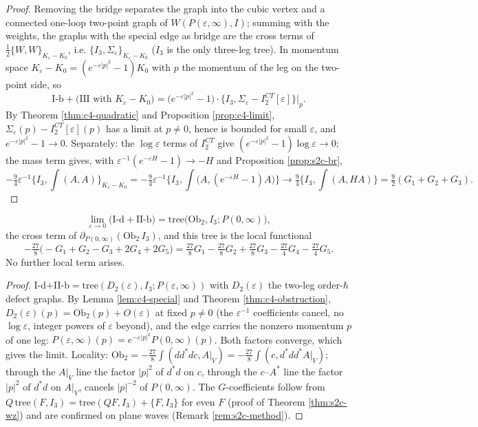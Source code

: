 \begin{proof}
Removing the bridge separates the graph into the cubic vertex and a connected one-loop two-point graph of $W(P(\varepsilon,\infty),I)$; summing with the weights, the graphs with the special edge as bridge are the cross terms of $\tfrac12\{W,W\}_{K_\varepsilon-K_0}$, i.e. $\{I_3,\Sigma_\varepsilon\}_{K_\varepsilon-K_0}$ ($I_3$ is the only three-leg tree). In momentum space $K_\varepsilon-K_0=(e^{-\varepsilon|p|^2}-1)K_0$ with $p$ the momentum of the leg on the two-point side, so
\[
\text{I-b}+\big(\text{III with }K_\varepsilon-K_0\big)=\big(e^{-\varepsilon|p|^2}-1\big)\cdot\{I_3,\Sigma_\varepsilon-I^{CT}_2[\varepsilon]\}\big|_{p}.
\]
By Theorem \ref{thm:c4-quadratic} and Proposition \ref{prop:c4-limit}, $\Sigma_\varepsilon(p)-I^{CT}_2[\varepsilon](p)$ has a limit at $p\neq0$, hence is bounded for small $\varepsilon$, and $e^{-\varepsilon|p|^2}-1\to0$. Separately: the $\log\varepsilon$ terms of $I^{CT}_2$ give $(e^{-\varepsilon|p|^2}-1)\log\varepsilon\to0$; the mass term gives, with $\varepsilon^{-1}(e^{-\varepsilon H}-1)\to-H$ and Proposition \ref{prop:s2c-br},
\[
-\tfrac94\varepsilon^{-1}\Big\{I_3,\int(A,A)\Big\}_{K_\varepsilon-K_0}=-\tfrac94\varepsilon^{-1}\Big\{I_3,\int\big(A,(e^{-\varepsilon H}-1)A\big)\Big\}\longrightarrow\tfrac94\Big\{I_3,\int(A,HA)\Big\}=\tfrac92(G_1+G_2+G_3).
\]
\end{proof}

\begin{proposition}[I-d and II-b]
\label{prop:s2c-lim2}
\[
\lim_{\varepsilon\to0}\big(\text{I-d}+\text{II-b}\big)=\mathrm{tree}\big(\mathrm{Ob}_2,I_3;P(0,\infty)\big),
\]
the cross term of $\partial_{P(0,\infty)}(\mathrm{Ob}_2\,I_3)$, and this tree is the local functional
\[
-\tfrac{27}8\big(-G_1+G_2-G_3+2G_4+2G_5\big)=\tfrac{27}8G_1-\tfrac{27}8G_2+\tfrac{27}8G_3-\tfrac{27}4G_4-\tfrac{27}4G_5 .
\]
No further local term arises.
\end{proposition}

\begin{proof}
I-d$+$II-b$=\mathrm{tree}(D_2(\varepsilon),I_3;P(\varepsilon,\infty))$ with $D_2(\varepsilon)$ the two-leg order-$\hbar$ defect graphs. By Lemma \ref{lem:c4-special} and Theorem \ref{thm:c4-obstruction}, $D_2(\varepsilon)(p)=\mathrm{Ob}_2(p)+O(\varepsilon)$ at fixed $p\neq0$ (the $\varepsilon^{-1}$ coefficients cancel, no $\log\varepsilon$, integer powers of $\varepsilon$ beyond), and the edge carries the nonzero momentum $p$ of one leg: $P(\varepsilon,\infty)(p)=e^{-\varepsilon|p|^2}P(0,\infty)(p)$. Both factors converge, which gives the limit. Locality: $\mathrm{Ob}_2=-\tfrac{27}8\int(dd^*dc,A|_V)=-\tfrac{27}8\int(c,d^*dd^*A|_V)$; through the $A|_V$ line the factor $|p|^2$ of $d^*d$ on $c$, through the $c$--$A^*$ line the factor $|p|^2$ of $d^*d$ on $A|_V$, cancels $|p|^{-2}$ of $P(0,\infty)$. The $G$-coefficients follow from $Q\,\mathrm{tree}(F,I_3)=\mathrm{tree}(QF,I_3)+\{F,I_3\}$ for even $F$ (proof of Theorem \ref{thm:s2c-wz}) and are confirmed on plane waves (Remark \ref{rem:s2c-method}).
\end{proof}

